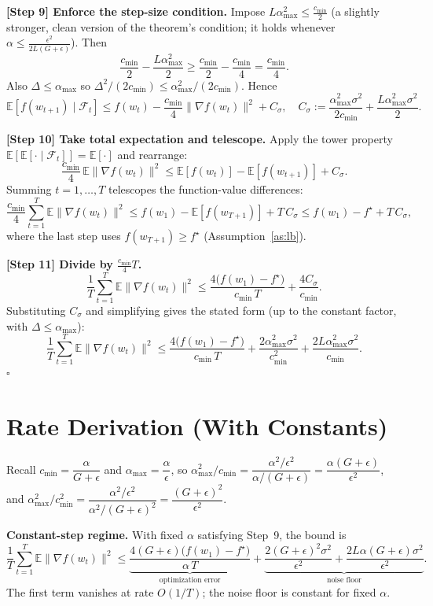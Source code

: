 \documentclass[11pt]{article}
\begin{document}
\noindent\textbf{[Step 9] Enforce the step-size condition.}
Impose $L\alpha_{\max}^2 \le \tfrac{c_{\min}}{2}$ (a slightly stronger,
clean version of the theorem's condition; it holds whenever
$\alpha\le \tfrac{\epsilon^2}{2L(G+\epsilon)}$). Then
\[
\frac{c_{\min}}{2}-\frac{L\alpha_{\max}^2}{2}
\ge \frac{c_{\min}}{2}-\frac{c_{\min}}{4}
= \frac{c_{\min}}{4}.
\]
Also $\Delta\le\alpha_{\max}$ so $\Delta^2/(2c_{\min})\le
\alpha_{\max}^2/(2c_{\min})$. Hence
\[
\mathbb{E}[f(w_{t+1})\mid\mathcal F_t]
\le f(w_t) - \frac{c_{\min}}{4}\|\nabla f(w_t)\|^2
+ C_\sigma,
\quad
C_\sigma := \frac{\alpha_{\max}^2\sigma^2}{2c_{\min}}
+ \frac{L\alpha_{\max}^2\sigma^2}{2}.
\]

\noindent\textbf{[Step 10] Take total expectation and telescope.}
Apply the tower property $\mathbb E[\mathbb E[\cdot\mid\mathcal F_t]]
=\mathbb E[\cdot]$ and rearrange:
\[
\frac{c_{\min}}{4}\,\mathbb E\|\nabla f(w_t)\|^2
\le \mathbb E[f(w_t)] - \mathbb E[f(w_{t+1})] + C_\sigma.
\]
Summing $t=1,\dots,T$ telescopes the function-value differences:
\[
\frac{c_{\min}}{4}\sum_{t=1}^T \mathbb E\|\nabla f(w_t)\|^2
\le f(w_1) - \mathbb E[f(w_{T+1})] + T\,C_\sigma
\le f(w_1) - f^\star + T\,C_\sigma,
\]
where the last step uses $f(w_{T+1})\ge f^\star$ (Assumption~\ref{as:lb}).

\noindent\textbf{[Step 11] Divide by $\tfrac{c_{\min}}{4}T$.}
\[
\frac{1}{T}\sum_{t=1}^T \mathbb E\|\nabla f(w_t)\|^2
\le \frac{4\big(f(w_1)-f^\star\big)}{c_{\min}\,T}
+ \frac{4 C_\sigma}{c_{\min}}.
\]
Substituting $C_\sigma$ and simplifying gives the stated form
(up to the constant factor, with $\Delta\le\alpha_{\max}$):
\[
\frac{1}{T}\sum_{t=1}^T \mathbb E\|\nabla f(w_t)\|^2
\le \frac{4\big(f(w_1)-f^\star\big)}{c_{\min}\,T}
+ \frac{2\alpha_{\max}^2\sigma^2}{c_{\min}^2}
+ \frac{2L\alpha_{\max}^2\sigma^2}{c_{\min}}.
\]
\hfill$\square$

\section*{Rate Derivation (With Constants)}

Recall $c_{\min}=\dfrac{\alpha}{G+\epsilon}$ and
$\alpha_{\max}=\dfrac{\alpha}{\epsilon}$, so
$\alpha_{\max}^2/c_{\min} = \dfrac{\alpha^2/\epsilon^2}{\alpha/(G+\epsilon)}
= \dfrac{\alpha(G+\epsilon)}{\epsilon^2}$, and
$\alpha_{\max}^2/c_{\min}^2 = \dfrac{\alpha^2/\epsilon^2}{\alpha^2/(G+\epsilon)^2}
= \dfrac{(G+\epsilon)^2}{\epsilon^2}$.

\textbf{Constant-step regime.}
With fixed $\alpha$ satisfying Step~9, the bound is
\[
\frac{1}{T}\sum_{t=1}^T \mathbb E\|\nabla f(w_t)\|^2
\le \underbrace{\frac{4(G+\epsilon)\big(f(w_1)-f^\star\big)}{\alpha\,T}}_{\text{optimization error}}
+ \underbrace{\frac{2(G+\epsilon)^2\sigma^2}{\epsilon^2}
+ \frac{2L\alpha(G+\epsilon)\sigma^2}{\epsilon^2}}_{\text{noise floor}} .
\]
The first term vanishes at rate $O(1/T)$; the noise floor is constant for
fixed $\alpha$.
\end{document}
